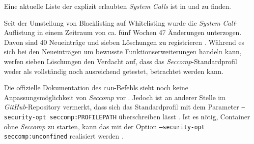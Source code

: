 \documentclass[../main.tex]{subfiles}
\begin{document}
			Eine aktuelle Liste der explizit erlaubten \emph{System Calls} ist in \cite{githubSeccompProfile} und \cite{githubSeccompDoc} zu finden.

			Seit der Umstellung von Blacklisting auf Whitelisting wurde die \emph{System Call}-Auflistung in einem Zeitraum von ca. fünf Wochen 47 Änderungen unterzogen. Davon sind 40 Neueinträge und sieben Löschungen zu registrieren \cite{githubSeccompProfileHistory}. Während es sich bei den Neueinträgen um bewusste Funktionserweiterungen handeln kann, werfen sieben Löschungen den Verdacht auf, dass das \emph{Seccomp}-Standardprofil weder als vollständig noch ausreichend getestet, betrachtet werden kann.

			Die offizielle Dokumentation des \texttt{run}-Befehls sieht noch keine Anpassungsmöglichkeit von \emph{Seccomp} vor \cite{dockerRun}. Jedoch ist an anderer Stelle im \emph{GitHub}-Repository vermerkt, dass sich das Standardprofil mit dem Parameter \texttt{--security-opt seccomp:PROFILEPATH} überschreiben lässt \cite{githubSeccompDoc}. Ist es nötig, Container ohne \emph{Seccomp} zu starten, kann das mit der Option \texttt{--security-opt seccomp:unconfined} realisiert werden \cite{dockerRun}\cite{docker110Security}.




\end{document}
